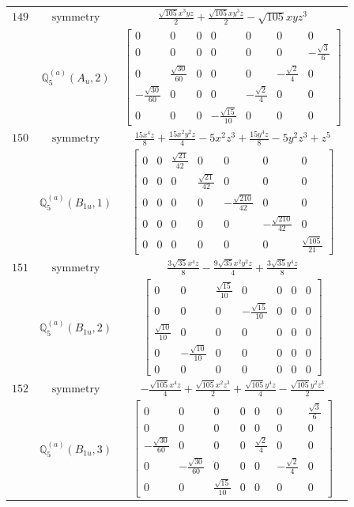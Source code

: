 \documentclass[fleqn,8pt,landscape]{jsarticle}
\begin{document}
\begin{longtable}{ccc}
$ 149 $ & $ \text{symmetry} $ & $ \frac{\sqrt{105} x^{3} y z}{2} + \frac{\sqrt{105} x y^{3} z}{2} - \sqrt{105} x y z^{3} $ \\
$  $ & $ \mathbb{Q}_{5}^{(a)}(A_{u},2) $ & $ \begin{bmatrix} 0 & 0 & 0 & 0 & 0 & 0 & 0 \\ 0 & 0 & 0 & 0 & 0 & 0 & - \frac{\sqrt{3}}{6} \\ 0 & \frac{\sqrt{30}}{60} & 0 & 0 & 0 & - \frac{\sqrt{2}}{4} & 0 \\ - \frac{\sqrt{30}}{60} & 0 & 0 & 0 & - \frac{\sqrt{2}}{4} & 0 & 0 \\ 0 & 0 & 0 & - \frac{\sqrt{15}}{10} & 0 & 0 & 0 \end{bmatrix} $ \\ \hline
$ 150 $ & $ \text{symmetry} $ & $ \frac{15 x^{4} z}{8} + \frac{15 x^{2} y^{2} z}{4} - 5 x^{2} z^{3} + \frac{15 y^{4} z}{8} - 5 y^{2} z^{3} + z^{5} $ \\
$  $ & $ \mathbb{Q}_{5}^{(a)}(B_{1u},1) $ & $ \begin{bmatrix} 0 & 0 & \frac{\sqrt{21}}{42} & 0 & 0 & 0 & 0 \\ 0 & 0 & 0 & \frac{\sqrt{21}}{42} & 0 & 0 & 0 \\ 0 & 0 & 0 & 0 & - \frac{\sqrt{210}}{42} & 0 & 0 \\ 0 & 0 & 0 & 0 & 0 & - \frac{\sqrt{210}}{42} & 0 \\ 0 & 0 & 0 & 0 & 0 & 0 & \frac{\sqrt{105}}{21} \end{bmatrix} $ \\ \hline
$ 151 $ & $ \text{symmetry} $ & $ \frac{3 \sqrt{35} x^{4} z}{8} - \frac{9 \sqrt{35} x^{2} y^{2} z}{4} + \frac{3 \sqrt{35} y^{4} z}{8} $ \\
$  $ & $ \mathbb{Q}_{5}^{(a)}(B_{1u},2) $ & $ \begin{bmatrix} 0 & 0 & \frac{\sqrt{15}}{10} & 0 & 0 & 0 & 0 \\ 0 & 0 & 0 & - \frac{\sqrt{15}}{10} & 0 & 0 & 0 \\ \frac{\sqrt{10}}{10} & 0 & 0 & 0 & 0 & 0 & 0 \\ 0 & - \frac{\sqrt{10}}{10} & 0 & 0 & 0 & 0 & 0 \\ 0 & 0 & 0 & 0 & 0 & 0 & 0 \end{bmatrix} $ \\ \hline
$ 152 $ & $ \text{symmetry} $ & $ - \frac{\sqrt{105} x^{4} z}{4} + \frac{\sqrt{105} x^{2} z^{3}}{2} + \frac{\sqrt{105} y^{4} z}{4} - \frac{\sqrt{105} y^{2} z^{3}}{2} $ \\
$  $ & $ \mathbb{Q}_{5}^{(a)}(B_{1u},3) $ & $ \begin{bmatrix} 0 & 0 & 0 & 0 & 0 & 0 & \frac{\sqrt{3}}{6} \\ 0 & 0 & 0 & 0 & 0 & 0 & 0 \\ - \frac{\sqrt{30}}{60} & 0 & 0 & 0 & \frac{\sqrt{2}}{4} & 0 & 0 \\ 0 & - \frac{\sqrt{30}}{60} & 0 & 0 & 0 & - \frac{\sqrt{2}}{4} & 0 \\ 0 & 0 & \frac{\sqrt{15}}{10} & 0 & 0 & 0 & 0 \end{bmatrix} $ \\ \hline

\end{longtable}
\end{document}
